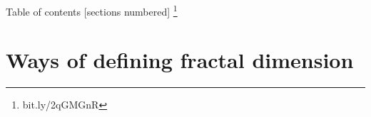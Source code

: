 \documentclass[10pt]{beamer}
\newcommand\blfootnote[1]{%
  \begingroup
  \renewcommand\thefootnote{}\footnote{#1}%
  \addtocounter{footnote}{-1}%
  \endgroup
}
\begin{document}
\begin{frame}{Table of contents}
    [sections numbered]
    \tableofcontents[hideallsubsections]
    \blfootnote{bit.ly/2qGMGnR}
\end{frame}


\section{Ways of defining fractal dimension}


\end{document}
